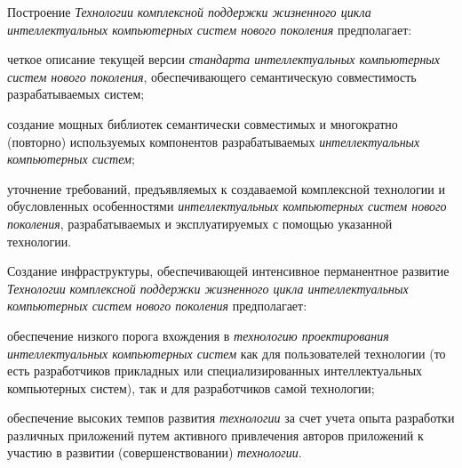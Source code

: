 Построение \textit{Технологии} \textit{комплексной поддержки жизненного цикла интеллектуальных компьютерных систем нового поколения} предполагает:

\begin{textitemize}
	\item четкое описание текущей версии \textit{стандарта интеллектуальных компьютерных систем нового поколения}, обеспечивающего семантическую совместимость разрабатываемых систем;
	\item создание мощных библиотек семантически совместимых и многократно (повторно) используемых компонентов разрабатываемых \textit{интеллектуальных компьютерных систем};
	\item уточнение требований, предъявляемых к создаваемой комплексной технологии и обусловленных особенностями \textit{интеллектуальных компьютерных систем нового поколения}, разрабатываемых и эксплуатируемых с помощью указанной технологии.
\end{textitemize}

Создание инфраструктуры, обеспечивающей интенсивное перманентное развитие \textit{Технологии} \textit{комплексной поддержки жизненного цикла интеллектуальных компьютерных систем нового поколения} предполагает:

\begin{textitemize}
	\item обеспечение низкого порога вхождения в \textit{технологию проектирования интеллектуальных компьютерных систем} как для пользователей технологии (то есть разработчиков прикладных или специализированных интеллектуальных компьютерных систем), так и для разработчиков самой технологии;
	\item обеспечение высоких темпов развития \textit{технологии} за счет учета опыта разработки различных приложений путем активного привлечения авторов приложений к участию в развитии (совершенствовании) \textit{технологии}.
\end{textitemize}

